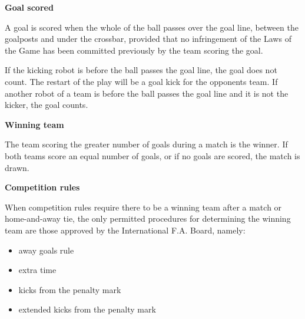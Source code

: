 \clearpage
\sffamily
{\bfseries\color[rgb]{0.4,0.4,0.4}{Law 10 -- The Method of Scoring} }
{}

\bigskip

{\bfseries Goal scored }

\headlinebox

A goal is scored when the whole of the ball passes over the goal line,
between the goalposts and under the crossbar,
provided that no infringement of the Laws of the Game has been committed
previously by the team scoring the goal.

\bigskip

If the kicking robot is   before the ball passes the goal line,
 the goal does not count.
The restart of the play will be a goal kick for the opponents team.
If another robot of a team is   before the ball
passes the goal line and it is not the kicker,  the goal counts.

\bigskip


\bigskip

{\bfseries Winning team}

\headlinebox

The team scoring the greater number of goals during a match is the winner. If both teams score an equal number of goals, or if no goals are scored, the match is drawn. 

\bigskip

{\bfseries Competition rules }

\headlinebox

When competition rules require there to be a winning team after a match or home-and-away tie, the only permitted procedures for determining the winning team are those approved by the International F.A. Board, namely:

\begin{itemize}
\item away goals rule
\item extra time
\item kicks from the penalty mark
\item {}extended kicks from the penalty mark
\end{itemize}


{\bfseries {}}

\removed{\headlinebox}

